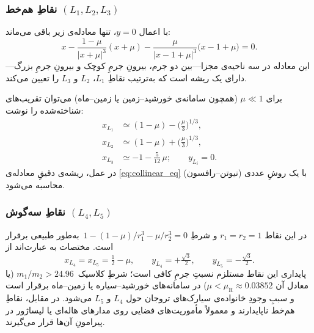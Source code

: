\subsubsection{نقاطِ هم‌خط \texorpdfstring{$(L_{1},L_{2},L_{3})$}{(L1,L2,L3)}}\label{subsec:collinear}

با اعمال $y=0$، تنها معادله‌ی زیر باقی می‌ماند:
\begin{equation}\label{eq:collinear_eq}
	x-\frac{1-\mu}{|x+\mu|^{3}}(x+\mu)-\frac{\mu}{|x-1+\mu|^{3}}\bigl(x-1+\mu\bigr)=0.
\end{equation}
این معادله در سه ناحیه‌ی مجزا—بین دو جرم، بیرونِ جرمِ کوچک و بیرونِ جرمِ بزرگ—دارای یک ریشه است که به‌ترتیب نقاطِ $L_{1}$، $L_{2}$ و $L_{3}$ را تعیین می‌کند.

برای $\mu\ll1$ (همچون سامانه‌ی خورشید–زمین یا زمین–ماه) می‌توان تقریب‌های شناخته‌شده را نوشت:
\begin{align*}
	x_{L_{1}} &\simeq (1-\mu)-\bigl(\tfrac{\mu}{3}\bigr)^{1/3},\\
	x_{L_{2}} &\simeq (1-\mu)+\bigl(\tfrac{\mu}{3}\bigr)^{1/3},\\
	x_{L_{3}} &\simeq -1-\tfrac{5}{12}\,\mu; \qquad y_{L_{i}}=0.
\end{align*}
در عمل، ریشه‌ی دقیقِ معادله‌ی \eqref{eq:collinear_eq} با یک روشِ عددی (نیوتن–رافسون) محاسبه می‌شود.

\subsubsection{نقاطِ سه‌گوش \texorpdfstring{$(L_{4},L_{5})$}{(L4,L5)}}\label{subsec:triangular}

در این نقاط $r_{1}=r_{2}=1$ و شرطِ
\(1-(1-\mu)/r_{1}^{3}-\mu/r_{2}^{3}=0\)\, به‌طور طبیعی برقرار است. مختصات به  عبارت‌اند از
\begin{equation}
	x_{L_{4}}=x_{L_{5}}=\tfrac12-\mu,\qquad
	y_{L_{4}}=+\tfrac{\sqrt3}{2},\qquad
	y_{L_{5}}=-\tfrac{\sqrt3}{2}.
\end{equation}
پایداری این نقاط مستلزم نسبتِ جرمِ کافی است؛ شرطِ کلاسیک~$m_{1}/m_{2}>24.96$ (یا معادل آن $\mu<\mu_{\mathrm R}\approx0.03852$) در سامانه‌های خورشید–سیاره یا زمین–ماه برقرار است و سببِ وجودِ خانواده‌ی سیارک‌های تروجان حول $L_{4}$ و $L_{5}$ می‌شود. در مقابل، نقاطِ هم‌خط ناپایدارند و معمولاً مأموریت‌های فضایی روی مدارهای هاله‌ای یا لیساژور در پیرامونِ آن‌ها قرار می‌گیرند.


